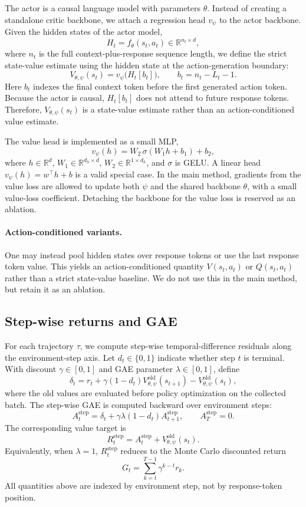 \documentclass[10pt]{article}
\begin{document}
The actor is a causal language model with parameters $\theta$. Instead of creating a standalone critic backbone, we attach a regression head $v_\psi$ to the actor backbone. Given the hidden states of the actor model,
\[
H_t = f_\theta(s_t,a_t) \in \mathbb{R}^{n_t\times d},
\]
where $n_t$ is the full context-plus-response sequence length, we define the strict state-value estimate using the hidden state at the action-generation boundary:
\[
V_{\theta,\psi}(s_t)
= v_\psi\bigl(H_t[b_t]\bigr),
\qquad
b_t = n_t - L_t - 1.
\]
Here $b_t$ indexes the final context token before the first generated action token. Because the actor is causal, $H_t[b_t]$ does not attend to future response tokens. Therefore, $V_{\theta,\psi}(s_t)$ is a state-value estimate rather than an action-conditioned value estimate.

The value head is implemented as a small MLP,
\[
v_\psi(h) = W_2\,\sigma(W_1 h + b_1) + b_2,
\]
where $h\in\mathbb{R}^d$, $W_1\in\mathbb{R}^{d_h\times d}$, $W_2\in\mathbb{R}^{1\times d_h}$, and $\sigma$ is GELU. A linear head $v_\psi(h)=w^\top h+b$ is a valid special case. In the main method, gradients from the value loss are allowed to update both $\psi$ and the shared backbone $\theta$, with a small value-loss coefficient. Detaching the backbone for the value loss is reserved as an ablation.

\paragraph{Action-conditioned variants.}
One may instead pool hidden states over response tokens or use the last response token value. This yields an action-conditioned quantity $V(s_t,a_t)$ or $Q(s_t,a_t)$ rather than a strict state-value baseline. We do not use this in the main method, but retain it as an ablation.

\subsection*{Step-wise returns and GAE}

For each trajectory $\tau$, we compute step-wise temporal-difference residuals along the environment-step axis. Let $d_t\in\{0,1\}$ indicate whether step $t$ is terminal. With discount $\gamma\in[0,1]$ and GAE parameter $\lambda\in[0,1]$, define
\[
\delta_t
= r_t + \gamma (1-d_t) V_{\theta,\psi}^{\mathrm{old}}(s_{t+1})
  - V_{\theta,\psi}^{\mathrm{old}}(s_t),
\]
where the old values are evaluated before policy optimization on the collected batch. The step-wise GAE is computed backward over environment steps:
\[
A^{\mathrm{step}}_t
= \delta_t + \gamma\lambda(1-d_t) A^{\mathrm{step}}_{t+1},
\qquad
A^{\mathrm{step}}_{T}=0.
\]
The corresponding value target is
\[
R^{\mathrm{step}}_t
= A^{\mathrm{step}}_t + V_{\theta,\psi}^{\mathrm{old}}(s_t).
\]
Equivalently, when $\lambda=1$, $R^{\mathrm{step}}_t$ reduces to the Monte Carlo discounted return
\[
G_t = \sum_{k=t}^{T-1} \gamma^{k-t} r_k.
\]
All quantities above are indexed by environment step, not by response-token position.
\end{document}
